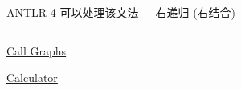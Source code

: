 \begin{frame}{}
  \begin{columns}
      \vspace{0.20cm}
      \begin{center}
        ANTLR 4 可以处理该文法
      \end{center}
      \pause
      \begin{center}
        右递归 (右结合)
      \end{center}
  \end{columns}
\end{frame}

\begin{frame}{}
  \begin{center}
    {\Large \href{https://github.com/courses-at-nju-by-hfwei/compilers-antlr/tree/main/src/main/java/cymbol/callgraph}{Call Graphs}}
  \end{center}

  \vspace{-0.80cm}
\end{frame}

\begin{frame}{}
  \begin{center}
    {\Large \href{https://github.com/courses-at-nju-by-hfwei/compilers-antlr/tree/main/src/main/java/cymbol/calc}{Calculator}}
  \end{center}

\end{frame}

